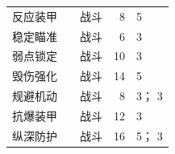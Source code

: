 \begin{small}
\begin{longtable}{@{}P{24mm}P{30mm}P{18mm}rP{50mm}@{}}
反应装甲 &  & 战斗 & 8 &  5 \\
稳定瞄准 &  & 战斗 & 6 &  3 \\
弱点锁定 &  & 战斗 & 10 &  3 \\
毁伤强化 &  & 战斗 & 14 &  5 \\
规避机动 &  & 战斗 & 8 &  3； 3 \\
抗爆装甲 &  & 战斗 & 12 &  3 \\
纵深防护 &  & 战斗 & 16 &  5； 3 \\
\bottomrule
\end{longtable}
\end{small}
\clearpage
